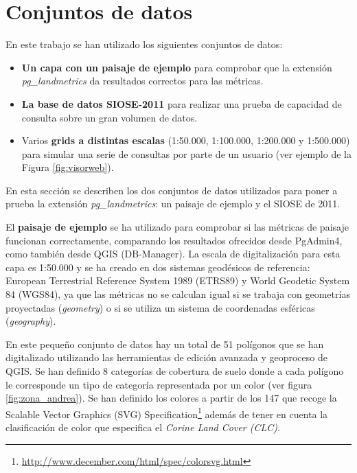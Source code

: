 \section{Conjuntos de datos}

\begin{graybox}

En este trabajo se han utilizado los siguientes conjuntos de datos:

\begin{itemize}
\item \textbf{Un capa con un paisaje de ejemplo} para comprobar que la extensión \textit{pg\_landmetrics} da resultados correctos para las métricas.
\item \textbf{La base de datos SIOSE-2011} para realizar una prueba de capacidad de consulta sobre un gran volumen de datos.
\item Varios \textbf{grids a distintas escalas} (1:50.000, 1:100.000, 1:200.000 y 1:500.000) para simular una serie de consultas por parte de un usuario (ver ejemplo de la Figura \ref{fig:visorweb}).

\end{itemize}
\end{graybox}

En esta sección se describen los dos conjuntos de datos utilizados para poner a prueba la extensión \textit{pg\_landmetrics}: un paisaje de ejemplo y el SIOSE de 2011.

El \textbf{paisaje de ejemplo} se ha utilizado para comprobar si las métricas de paisaje funcionan correctamente, comparando los resultados ofrecidos desde PgAdmin4, como también desde QGIS (DB-Manager). La escala de digitalización para esta capa es 1:50.000 y se ha creado en dos sistemas geodésicos de referencia: European Terrestrial Reference System 1989 (ETRS89) y World Geodetic System 84 (WGS84), ya que las métricas no se calculan igual si se trabaja con geometrías proyectadas (\textit{geometry}) o si se utiliza un sistema de coordenadas esféricas (\textit{geography}). 

En este pequeño conjunto de datos hay un total de 51 polígonos que se han digitalizado utilizando las herramientas de edición avanzada y geoproceso de QGIS. Se han definido 8 categorías de cobertura de suelo donde a cada polígono le corresponde un tipo de categoría representada por un color (ver figura \ref{fig:zona_andrea}). Se han definido los colores a partir de los 147 que recoge la Scalable Vector Graphics (SVG) Specification\footnote{\url{http://www.december.com/html/spec/colorsvg.html}} además de tener en cuenta la clasificación de color que especifica el \textit{Corine Land Cover (CLC)}.

